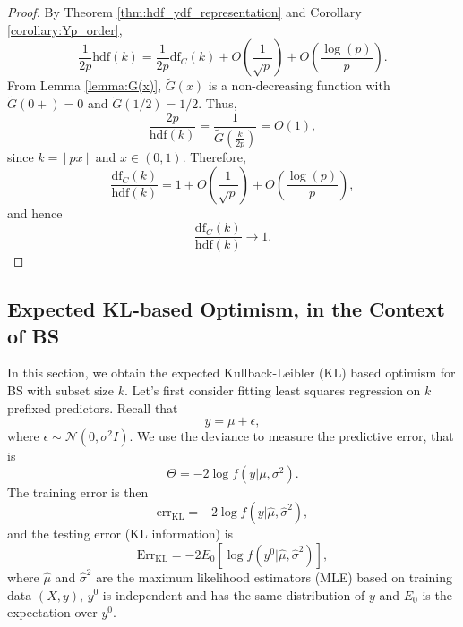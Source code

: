 \dfasycorollary*
\begin{proof}
	By Theorem \ref{thm:hdf_ydf_representation} and Corollary \ref{corollary:Yp_order},
	\begin{equation*}
	\frac{1}{2p} \text{hdf}(k) = \frac{1}{2p}\text{df}_C(k) + O\left(\frac{1}{\sqrt{p}}\right) + O\left(\frac{\log(p)}{p} \right).
	\end{equation*}
	From Lemma \ref{lemma:G(x)}, $\tilde{G}(x)$ is a non-decreasing function with $\tilde{G}(0+)=0$ and $\tilde{G}(1/2)=1/2$. Thus, 
	\begin{equation*}
	\frac{2p}{\text{hdf}(k)} = \frac{1}{\tilde{G}\left(\frac{k}{2p}\right)} = O(1),
	\end{equation*}
	since $k=\left \lfloor{px}\right \rfloor$ and $x\in(0,1)$. Therefore, 
	\begin{equation*}
	\frac{\text{df}_C(k)}{\text{hdf}(k)} = 1 + O\left(\frac{1}{\sqrt{p}}\right) + O\left(\frac{\log(p)}{p} \right),
	\end{equation*}
	and hence
	\begin{equation*}
	\frac{\text{df}_C(k)}{\text{hdf}(k)} \to 1.
	\end{equation*}
\end{proof}

\subsection{Expected KL-based Optimism, in the Context of BS }
\label{sec:expectedkl_bs}
In this section, we obtain the expected Kullback-Leibler (KL) based optimism for BS with subset size $k$. Let's first consider fitting least squares regression on $k$ prefixed predictors. Recall that 
\begin{equation*}
y = \mu + \epsilon,
\end{equation*}
where $\epsilon \sim \mathcal{N}(0,\sigma^2 I)$. We use the deviance to measure the predictive error, that is 
\begin{equation*}
\Theta=-2 \log f(y|\mu,\sigma^2).
\end{equation*}
The training error is then 
$$\text{err}_{\text{KL}} = -2 \log f (y|\hat{\mu},\hat{\sigma}^2),$$
and the testing error (KL information) is
$$\text{Err}_{\text{KL}}  = -2 E_0 \left[ \log f(y^0|\hat{\mu},\hat{\sigma}^2)\right],$$
where $\hat{\mu}$ and $\hat{\sigma}^2$ are the maximum likelihood estimators (MLE) based on training data $(X,y)$, $y^0$ is independent and has the same distribution of $y$ and $E_0$ is the expectation over $y^0$. 


